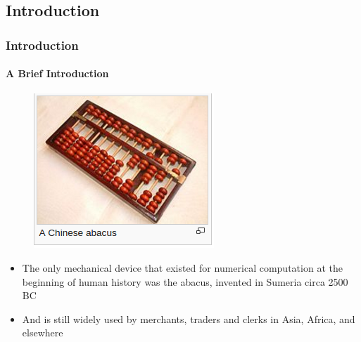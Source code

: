 \documentclass[hyperref={pdfpagelabels=true}]{beamer}
\begin{document}
\subsection{Introduction}
\begin{frame}
\frametitle{Introduction}
\framesubtitle{A Brief Introduction}
\begin{figure}[!tbp]
\centering
\includegraphics[scale = 0.55]{figs/Selection_002.png}
\end{figure}
\begin{itemize}
\item[\ding{45}] The only mechanical device that existed for numerical computation at the beginning of human history was the abacus, invented in Sumeria circa 2500 BC
\item[\ding{45}] And is still widely used by merchants, traders and clerks in Asia, Africa, and elsewhere
\end{itemize}
\end{frame}
\end{document}
